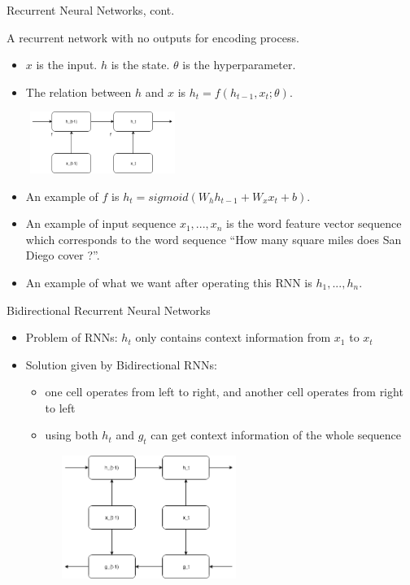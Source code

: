 \documentclass{beamer}
\begin{document}
\begin{frame}{Recurrent Neural Networks, cont.}
    \begin{examples}{A recurrent network with no outputs for encoding process.}
        \begin{itemize}
            \item $x$ is the input. $h$ is the state. $\theta$ is the hyperparameter.
            \item The relation between $h$ and $x$ is $h_t = f(h_{t-1}, x_t; \theta).$
                \begin{center}
                  \includegraphics[width=5cm, height=2cm]{figures/rnnWithNoOutputs}
                \end{center}
            \item An example of $f$ is $h_t = sigmoid(W_h h_{t-1} + W_x x_t + b).$
            \item An example of input sequence $x_1, ..., x_n$ is the word feature vector sequence which corresponds to the word sequence ``How many square miles does San Diego cover ?''.
            \item An example of what we want after operating this RNN is $h_1, ..., h_n$.
        \end{itemize}
    \end{examples}
\end{frame}

\begin{frame}{Bidirectional Recurrent Neural Networks}
    \begin{itemize}
        \item Problem of RNNs: $h_t$ only contains context information from $x_1$ to $x_t$
        \item Solution given by Bidirectional RNNs:
            \begin{itemize}
                \item one cell operates from left to right, and another cell operates from right to left
                \item using both $h_t$ and $g_t$ can get context information of the whole sequence
            \end{itemize}
             \begin{center}
                  \includegraphics[width=8cm, height=4cm]{figures/bidirectionalRnn.png}
            \end{center}
    \end{itemize}
\end{frame}
\end{document}

